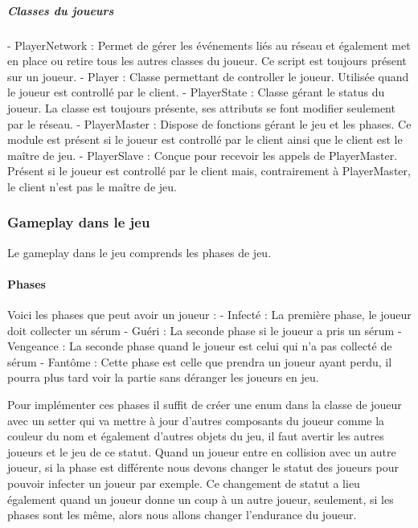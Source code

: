 \documentclass{article}
\begin{document}
\subparagraph{Classes du joueurs}


- PlayerNetwork : Permet de gérer les événements liés au réseau et également met en place ou retire tous les autres classes du joueur. Ce script est toujours présent sur un joueur.
- Player : Classe permettant de controller le joueur. Utilisée quand le joueur est controllé par le client.
- PlayerState : Classe gérant le status du joueur. La classe est toujours présente, ses attributs se font modifier seulement par le réseau.
- PlayerMaster : Dispose de fonctions gérant le jeu et les phases. Ce module est présent si le joueur est controllé par le client ainsi que le client est le maître de jeu.
- PlayerSlave : Conçue pour recevoir les appels de PlayerMaster. Présent si le joueur est controllé par le client mais, contrairement à PlayerMaster, le client n'est pas le maître de jeu.


\subsubsection{Gameplay dans le jeu}

Le gameplay dans le jeu comprends les phases de jeu.

\paragraph{Phases}

Voici les phases que peut avoir un joueur :
- Infecté : La première phase, le joueur doit collecter un sérum
- Guéri : La seconde phase si le joueur a pris un sérum
- Vengeance : La seconde phase quand le joueur est celui qui n'a pas collecté de sérum
- Fantôme : Cette phase est celle que prendra un joueur ayant perdu, il pourra plus tard voir la partie sans déranger les joueurs en jeu.

Pour implémenter ces phases il suffit de créer une enum dans la classe de joueur avec un setter qui va mettre à jour d'autres composants du joueur comme la couleur du nom et également d'autres objets du jeu, il faut avertir les autres joueurs et le jeu de ce statut. Quand un joueur entre en collision avec un autre joueur, si la phase est différente nous devons changer le statut des joueurs pour pouvoir infecter un joueur par exemple. Ce changement de statut a lieu également quand un joueur donne un coup à un autre joueur, seulement, si les phases sont les même, alors nous allons changer l'endurance du joueur.
\end{document}
